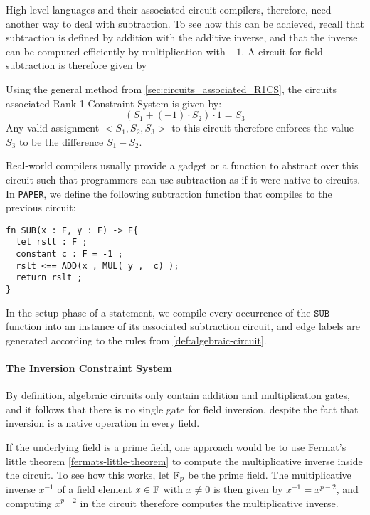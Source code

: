 High-level languages and their associated circuit compilers, therefore, need another way to deal with subtraction. To see how this can be achieved, recall that subtraction is defined by addition with the additive inverse, and that the inverse can be computed efficiently by multiplication with $-1$. A circuit for field subtraction is therefore given by
\begin{center}
\end{center}
Using the general method from \ref{sec:circuits_associated_R1CS}, the circuits associated Rank-1 Constraint System is given by:
\begin{equation}
\left(S_1 + (-1)\cdot S_2\right)\cdot 1 = S_3
\end{equation}
Any valid assignment $<S_1,S_2, S_3>$ to this circuit therefore enforces the value $S_3$ to be the difference $S_1- S_2$.

Real-world compilers usually provide a gadget or a function to abstract over this circuit such that programmers can use subtraction as if it were native to circuits.
In \texttt{PAPER}, we define the following subtraction function that compiles to the previous circuit:
\begin{lstlisting}
fn SUB(x : F, y : F) -> F{
  let rslt : F ;
  constant c : F = -1 ;
  rslt <== ADD(x , MUL( y ,  c) );
  return rslt ;
}
\end{lstlisting}
In the setup phase of a statement, we compile every occurrence of the $\mathtt{SUB}$ function into an instance of its associated subtraction circuit, and edge labels are generated according to the rules from \ref{def:algebraic-circuit}.
\paragraph{The Inversion Constraint System} By definition, algebraic circuits only contain addition and multiplication gates, and it follows that there is no single gate for field inversion, despite the fact that inversion is a native operation in every field. 

If the underlying field is a prime field, one approach would be to use Fermat's little theorem \ref{fermats-little-theorem} to compute the multiplicative inverse inside the circuit. To see how this works, let $\mathbb{F}_p$ be the prime field. The multiplicative inverse $x^{-1}$ of a field element $x\in\mathbb{F}$ with $x\neq 0$ is then given by $x^{-1}= x^{p-2}$, and computing $x^{p-2}$ in the circuit therefore computes the multiplicative inverse. 

